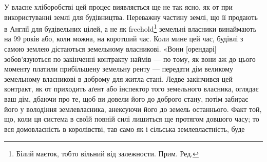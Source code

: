 У власне хліборобстві цей процес виявляється ще не так ясно, як
от при використуванні землі для будівництва. Переважну частину землі, що її
продають в Англії для будівельних цілей, а не як freehold\footnote*{
Білий маєток, тобто вільний від залежности. Прим. Ред.
} земельні власники
винаймають на 99 років або, коли можна, на коротший час. Коли мине цей
час, будівлі з самою землею дістаються земельному власникові. «Вони [орендарі]
зобов’язуються по закінченні контракту наймів — по тому, як вони аж до цього
моменту платили прибільшену земельну ренту — передати дім великому земельному
власникові в доброму для житла стані. Ледве закінчився цей контракт,
як от приходить аґент або інспектор того земельного власника, оглядає ваш
дім, дбаючи про те, щоб ви довели його до доброго стану, потім забирає його
у володіння землевласника, анексуючи його до земель останнього. Факт той, що,
коли ця система в своїй повній силі лишиться ще протягом довшого часу; то
вся домовласність в королівстві, тав само як і сільська землевластність, буде
\parbreak{}  %
